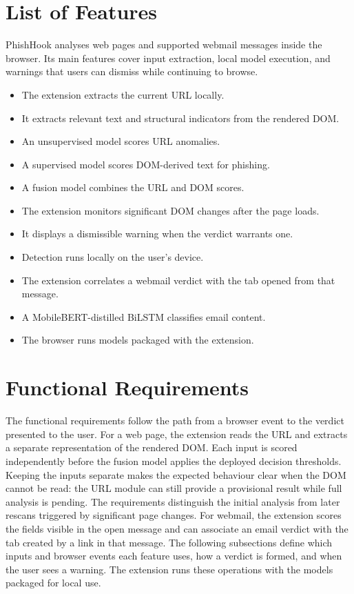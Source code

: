 \documentclass{FastFyp}
\begin{document}
\section{List of Features}
PhishHook analyses web pages and supported webmail messages inside the browser. Its main features cover input extraction, local model execution, and warnings that users can dismiss while continuing to browse.
\begin{itemize}
    \item The extension extracts the current URL locally.
    \item It extracts relevant text and structural indicators from the rendered DOM.
    \item An unsupervised model scores URL anomalies.
    \item A supervised model scores DOM-derived text for phishing.
    \item A fusion model combines the URL and DOM scores.
    \item The extension monitors significant DOM changes after the page loads.
    \item It displays a dismissible warning when the verdict warrants one.
    \item Detection runs locally on the user's device.
    \item The extension correlates a webmail verdict with the tab opened from that message.
    \item A MobileBERT-distilled BiLSTM classifies email content.
    \item The browser runs models packaged with the extension.
\end{itemize}

\section{Functional Requirements}
The functional requirements follow the path from a browser event to the verdict presented to the user. For a web page, the extension reads the URL and extracts a separate representation of the rendered DOM. Each input is scored independently before the fusion model applies the deployed decision thresholds. Keeping the inputs separate makes the expected behaviour clear when the DOM cannot be read: the URL module can still provide a provisional result while full analysis is pending. The requirements distinguish the initial analysis from later rescans triggered by significant page changes. For webmail, the extension scores the fields visible in the open message and can associate an email verdict with the tab created by a link in that message. The following subsections define which inputs and browser events each feature uses, how a verdict is formed, and when the user sees a warning. The extension runs these operations with the models packaged for local use.
\end{document}
